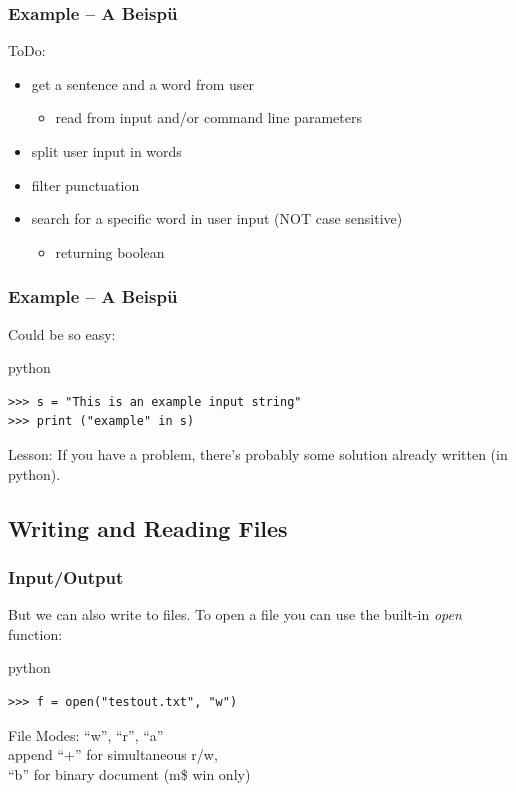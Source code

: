 \documentclass{beamer}
\begin{document}


\begin{frame}[fragile]
	\frametitle{Example -- A Beispü}
	
	ToDo:
	\begin{itemize}
	\item get a sentence and a word from user
		\begin{itemize}
		\item read from input and/or command line parameters
		\end{itemize}
	\item split user input in words
	\item filter punctuation
	\item search for a specific word in user input (NOT case sensitive)
		\begin{itemize}
		\item returning boolean
		\end{itemize}
	\end{itemize}
\end{frame}

\begin{frame}[fragile]
	\frametitle{Example -- A Beispü}
	
	Could be so easy:
\pause
	\begin{exampleblock}{python}
	\begin{lstlisting}
>>> s = "This is an example input string"
>>> print ("example" in s)
	\end{lstlisting}
	\end{exampleblock}
\pause
	\begin{block}{Lesson:}
	If you have a problem, there's probably some solution already written (in python).
	\end{block}
\end{frame}

\subsection{Writing and Reading Files}

\begin{frame}[fragile]
	\frametitle{Input/Output}

	But we can also write to files. To open a file you can use the built-in \emph{open} function:
	\begin{exampleblock}{python}
	\begin{lstlisting}
>>> f = open("testout.txt", "w")
	\end{lstlisting}
	\end{exampleblock}
\pause
	File Modes: ``w'', ``r'', ``a''\\
	append ``+'' for simultaneous r/w, \\
	``b'' for binary document (m\$ win only)
\end{frame}
\end{document}
